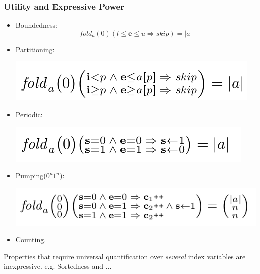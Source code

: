 \documentclass[11pt]{beamer}
\begin{document}
\begin{frame}\frametitle{Utility and Expressive Power}
\begin{itemize}
\item Boundedness:
\[fold_a(0)(l\le \textbf{e} \le u \Rightarrow skip) = |a|\]
\item Partitioning:
\begin{center}
\includegraphics[scale=0.36]{partitionafl.png}
\end{center}
\item Periodic:
\begin{center}
\includegraphics[scale=0.36]{periodicafl.png}
\end{center}
\item Pumping($0^n1^n$):
\begin{center}
\includegraphics[scale=0.36]{pumpingafl.png}
\end{center}
\item Counting.
\end{itemize}
Properties that require universal quantification over \textit{several} index variables are inexpressive.
e.g. Sortedness and ...
\end{frame}
\end{document}
